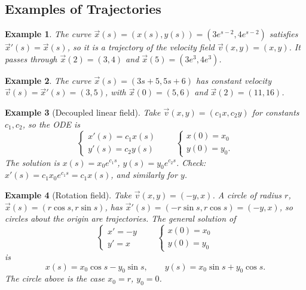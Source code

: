 \documentclass{article}
\newtheorem*{example}{Example}
\begin{document}
\subsection{Examples of Trajectories}
\begin{example}
    The curve $\vec{x}(s) = (x(s), y(s)) = (3e^{s-2}, 4e^{s-2})$ satisfies $\vec{x}'(s) = \vec{x}(s)$, so it is a trajectory of the velocity field $\vec{v}(x,y) = (x,y)$. It passes through $\vec{x}(2) = (3,4)$ and $\vec{x}(5) = (3e^3, 4e^3)$.
\end{example}
\begin{example}
    The curve $\vec{x}(s) = (3s+5, 5s+6)$ has constant velocity $\vec{v}(s) = \vec{x}'(s) = (3,5)$, with $\vec{x}(0) = (5,6)$ and $\vec{x}(2) = (11,16)$.
\end{example}
\begin{example}[Decoupled linear field]
    Take $\vec{v}(x,y) = (c_1 x, c_2 y)$ for constants $c_1, c_2$, so the ODE is
    \begin{equation}
        \begin{cases}
            x'(s) = c_1 x(s) \\
            y'(s) = c_2 y(s)
        \end{cases}
        \qquad
        \begin{cases}
            x(0) = x_0 \\
            y(0) = y_0.
        \end{cases}
    \end{equation}
    The solution is $x(s) = x_0 e^{c_1 s}$, $y(s) = y_0 e^{c_2 s}$. Check: $x'(s) = c_1 x_0 e^{c_1 s} = c_1 x(s)$, and similarly for $y$.
\end{example}
\begin{example}[Rotation field]
    Take $\vec{v}(x,y) = (-y, x)$. A circle of radius $r$, $\vec{x}(s) = (r\cos s, r\sin s)$, has $\vec{x}'(s) = (-r\sin s, r\cos s) = (-y, x)$, so circles about the origin are trajectories. The general solution of
    \begin{equation}
        \begin{cases}
            x' = -y \\
            y' = x
        \end{cases}
        \qquad
        \begin{cases}
            x(0) = x_0 \\
            y(0) = y_0
        \end{cases}
    \end{equation}
    is
    \begin{equation}
        x(s) = x_0 \cos s - y_0 \sin s, \qquad y(s) = x_0 \sin s + y_0 \cos s.
    \end{equation}
    The circle above is the case $x_0 = r$, $y_0 = 0$.
\end{example}
\end{document}
